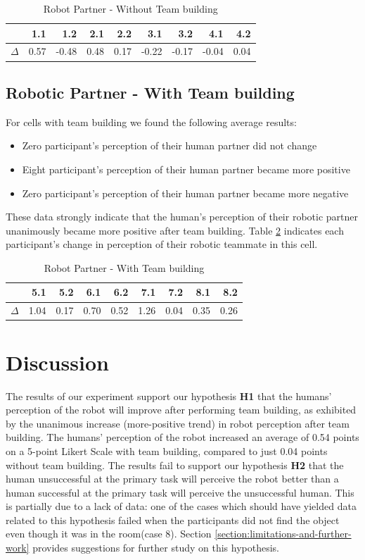 \documentclass{acm_proc_article-sp}
\begin{document}
\begin{table}
\centering
\caption{Robot Partner - Without Team building}
\begin{tabular}{|r|r|r|r|r|r|r|r|r|} \hline
&1.1&1.2&2.1&2.2&3.1&3.2&4.1&4.2\\ \hline
$\Delta$&0.57&-0.48&0.48&0.17&-0.22&-0.17&-0.04&0.04 \\ \hline
\end{tabular}
\label{table:RNT}
\end{table}

\subsection{Robotic Partner - With Team building}
For cells with team building we found the following average results:
\begin{itemize}
 \item Zero participant's perception of their human partner did not change
 \item Eight participant's perception of their human partner became more positive
 \item Zero participant's perception of their human partner became more negative
\end{itemize}
These data strongly indicate that the human's perception of their robotic partner unanimously became more positive after team building. Table \ref{table:RT} indicates each participant's change in perception of their robotic teammate in this cell.

\begin{table}
\centering
\caption{Robot Partner - With Team building}
\begin{tabular}{|r|r|r|r|r|r|r|r|r|} \hline
&5.1&5.2&6.1&6.2&7.1&7.2&8.1&8.2 \\ \hline
$\Delta$&1.04&0.17&0.70&0.52&1.26&0.04&0.35&0.26 \\ \hline
\end{tabular}
\label{table:RT}
\end{table}


\section{Discussion}
\label{section:discussion}
The results of our experiment support our hypothesis \textbf{H1} that the humans' perception of the robot will improve after performing team building, as exhibited by the unanimous increase (more-positive trend) in robot perception after team building. The humans' perception of the robot increased an average of 0.54 points on a 5-point Likert Scale with team building, compared to just 0.04 points without team building.
The results fail to support our hypothesis \textbf{H2} that the human unsuccessful at the primary task will perceive the robot better than a human successful at the primary task will perceive the unsuccessful human. This is partially due to a lack of data: one of the cases which should have yielded data related to this hypothesis failed when the participants did not find the object even though it was in the room(case 8). Section \ref{section:limitations-and-further-work} provides suggestions for further study on this hypothesis.
\end{document}
